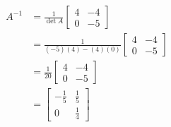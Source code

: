 \documentclass[letter,11pt]{article}
\begin{document}
\begin{tcolorbox}[boxrule=1mm, width=(.9\linewidth),before=\hfill,after=\hfill,adjusted title={Problem 2 Solutions}]

\begin{align*}
    A^{-1} &= \frac{1}{\operatorname{det} A} \begin{bmatrix} 4 & -4\\ 0 & -5 \end{bmatrix}\\ 
    &= \frac{1}{(-5)(4)-(4)(0)} \begin{bmatrix} 4 & -4\\ 0 & -5 \end{bmatrix} \\
    &= \frac{1}{20} \begin{bmatrix} 4 & -4\\ 0 & -5 \end{bmatrix}\\
    & = \begin{bmatrix} -\frac{1}{5} & \frac{1}{5}\\ 0 & \frac{1}{4} \end{bmatrix}
\end{align*}

\end{tcolorbox}

\newpage
\end{document}

